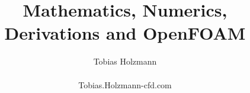 \newcommand{\cref}[1]{(\ref{#1})}
\newcommand{\rmm}{\mathrm}
\newcommand{\mr}{\mathrm}
\newcommand{\U}{\textbf{U}}
\newcommand{\bTau}{\boldsymbol \tau}
\newcommand{\bTauInco}{\boldsymbol \tau_\mathrm{inco}}
\newcommand{\X}{\raisebox{2pt}{$\chi$}}
\newcommand{\ct}{\cellcolor{gray!10}}
\newcommand{\ctt}{\cellcolor{gray!5}}
\newcommand{\SIMPLE}{\texttt{SIMPLE}\xspace}
\newcommand{\SIMPLEC}{\texttt{SIMPLEC}\xspace}
\newcommand{\SIMPLER}{\texttt{SIMPLER}\xspace}
\newcommand{\SIMPLEM}{\texttt{SIMPLEM}\xspace}
\newcommand{\PISO}{\texttt{PISO}\xspace}
\newcommand{\PIMPLE}{\texttt{PIMPLE}\xspace}
\renewcommand{\textregistered}{\textsuperscript{\circledR}}
\newcommand\numberthis{\addtocounter{equation}{1}\tag{\theequation}}
\newcommand{\tr}{^T}
\newcommand{\D}{\mathrm{D}}
\newcommand{\Co}{\mathrm{Co}}
\newcommand{\vA}{\textbf{a}}
\newcommand{\vB}{\textbf{b}}
\newcommand{\vU}{\textbf{U}}
\newcommand{\tT}{\textbf{T}}
\newcommand{\OF}{OpenFOAM\textregistered\xspace}
\newcommand{\OFV}{7.x\xspace}
\newcommand{\red}{\color{red}}



\setlength{\intextsep}{22pt}
\setlength{\abovecaptionskip}{22pt}

\title{
  Mathematics, Numerics, Derivations and \OF
}


\author{
    Tobias Holzmann \\ ~ \\ Tobias.Holzmann\@Holzmann-cfd.com
}


